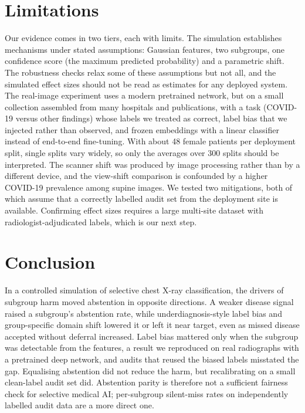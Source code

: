 \documentclass[conference]{IEEEtran}
\begin{document}
\section{Limitations}

Our evidence comes in two tiers, each with limits. The simulation establishes mechanisms under stated assumptions: Gaussian features, two subgroups, one confidence score (the maximum predicted probability) and a parametric shift. The robustness checks relax some of these assumptions but not all, and the simulated effect sizes should not be read as estimates for any deployed system. The real-image experiment uses a modern pretrained network, but on a small collection assembled from many hospitals and publications, with a task (COVID-19 versus other findings) whose labels we treated as correct, label bias that we injected rather than observed, and frozen embeddings with a linear classifier instead of end-to-end fine-tuning. With about 48 female patients per deployment split, single splits vary widely, so only the averages over 300 splits should be interpreted. The scanner shift was produced by image processing rather than by a different device, and the view-shift comparison is confounded by a higher COVID-19 prevalence among supine images. We tested two mitigations, both of which assume that a correctly labelled audit set from the deployment site is available. Confirming effect sizes requires a large multi-site dataset with radiologist-adjudicated labels, which is our next step.

\section{Conclusion}

In a controlled simulation of selective chest X-ray classification, the drivers of subgroup harm moved abstention in opposite directions. A weaker disease signal raised a subgroup's abstention rate, while underdiagnosis-style label bias and group-specific domain shift lowered it or left it near target, even as missed disease accepted without deferral increased. Label bias mattered only when the subgroup was detectable from the features, a result we reproduced on real radiographs with a pretrained deep network, and audits that reused the biased labels misstated the gap. Equalising abstention did not reduce the harm, but recalibrating on a small clean-label audit set did. Abstention parity is therefore not a sufficient fairness check for selective medical AI; per-subgroup silent-miss rates on independently labelled audit data are a more direct one.
\end{document}
